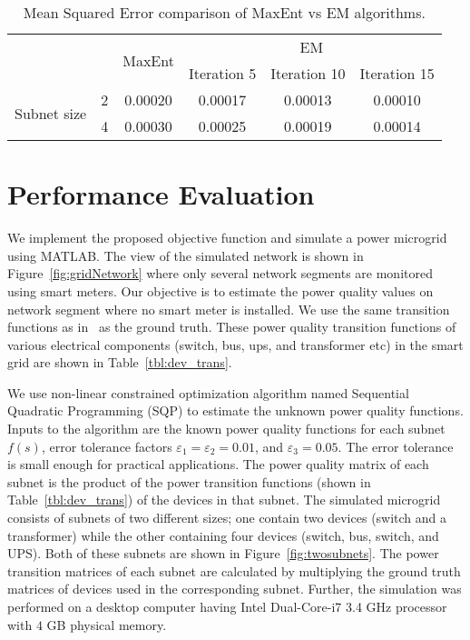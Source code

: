 \begin{table}[!p]
\renewcommand{\tabcolsep}{0.5 cm}
\renewcommand*{\arraystretch}{2}
\centering \caption{Mean Squared Error comparison of MaxEnt vs EM algorithms.}
\begin{tabular}{|c|c|c|c|c|c|}
 \hline \multicolumn{2}{|c|}{\multirow{2}{*}{}} & \multirow{2}{*}{MaxEnt} & \multicolumn{3}{c|}{EM}\\
\cline{4-6}
\multicolumn{2}{|c|}{} & & Iteration 5 & Iteration 10 & Iteration 15\\
\hline
\multirow{2}{*}{Subnet size} & 2 & 0.00020 & 0.00017 & 0.00013 & 0.00010\\
\cline{2-6}
& 4 & 0.00030 & 0.00025 & 0.00019 & 0.00014\\
\hline
\end{tabular}
\label{tbl:eval_mse}
\end{table}

\section{Performance Evaluation}
\label{sec:evaluation}
We implement the proposed objective function and simulate a power microgrid using MATLAB. The view of the simulated network is shown in Figure~\ref{fig:gridNetwork} where only several network segments are monitored using smart meters. Our objective is to estimate the power quality values on network segment where no smart meter is installed. We use the same transition functions as in~\cite{catherine_pri} as the ground truth. These power quality transition functions of various electrical components (switch, bus, ups, and transformer etc) in the smart grid are shown in Table~\ref{tbl:dev_trans}.

We use non-linear constrained optimization algorithm named Sequential Quadratic Programming (SQP) to estimate the unknown power quality functions. Inputs to the algorithm are the known power quality functions for each subnet $f(s)$, error tolerance factors $\varepsilon_1 = \varepsilon_2 = 0.01$, and $ \varepsilon_3 = 0.05$. The error tolerance is small enough for practical applications. The power quality matrix of each subnet is the product of the power transition functions (shown in Table~\ref{tbl:dev_trans}) of the devices in that subnet. The simulated microgrid consists of subnets of two different sizes; one contain two devices (switch and a transformer) while the other containing four devices (switch, bus, switch, and UPS). Both of these subnets are shown in Figure~\ref{fig:twosubnets}. The power transition matrices of each subnet are calculated by multiplying the ground truth matrices of devices used in the corresponding subnet. Further, the simulation was performed on a desktop computer having Intel Dual-Core-i7 3.4 GHz processor with $4$ GB physical memory.

